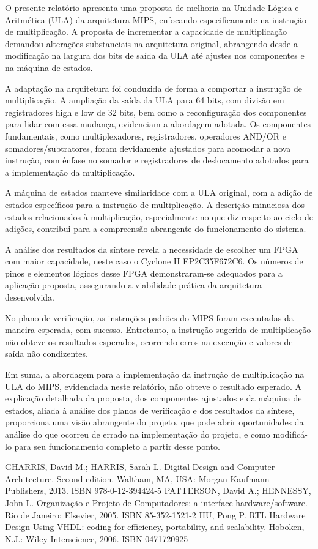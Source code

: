 \documentclass[conference]{IEEEtran}
\begin{document}
O presente relatório apresenta uma proposta de melhoria na Unidade Lógica e Aritmética (ULA) da arquitetura MIPS, enfocando especificamente na instrução de multiplicação. A proposta de incrementar a capacidade de multiplicação demandou alterações substanciais na arquitetura original, abrangendo desde a modificação na largura dos bits de saída da ULA até ajustes nos componentes e na máquina de estados.

A adaptação na arquitetura foi conduzida de forma a comportar a instrução de multiplicação. A ampliação da saída da ULA para 64 bits, com divisão em registradores high e low de 32 bits, bem como a reconfiguração dos componentes para lidar com essa mudança, evidenciam a abordagem adotada. Os componentes fundamentais, como multiplexadores, registradores, operadores AND/OR e somadores/subtratores, foram devidamente ajustados para acomodar a nova instrução, com ênfase no somador e registradores de deslocamento adotados para a implementação da multiplicação.

A máquina de estados manteve similaridade com a ULA original, com a adição de estados específicos para a instrução de multiplicação. A descrição minuciosa dos estados relacionados à multiplicação, especialmente no que diz respeito ao ciclo de adições, contribui para a compreensão abrangente do funcionamento do sistema.

A análise dos resultados da síntese revela a necessidade de escolher um FPGA com maior capacidade, neste caso o Cyclone II EP2C35F672C6. Os números de pinos e elementos lógicos desse FPGA demonstraram-se adequados para a aplicação proposta, assegurando a viabilidade prática da arquitetura desenvolvida.

No plano de verificação, as instruções padrões do MIPS foram executadas da maneira esperada, com sucesso. Entretanto, a instrução sugerida de multiplicação não obteve os resultados esperados, ocorrendo erros na execução e valores de saída não condizentes.

Em suma, a abordagem para a implementação da instrução de multiplicação na ULA do MIPS, evidenciada neste relatório, não obteve o resultado esperado. A explicação detalhada da proposta, dos componentes ajustados e da máquina de estados, aliada à análise dos planos de verificação e dos resultados da síntese, proporciona uma visão abrangente do projeto, que pode abrir oportunidades da análise do que ocorreu de errado na implementação do projeto, e como modificá-lo para seu funcionamento completo a partir desse ponto.

\begin{thebibliography}{00}
 GHARRIS, David M.; HARRIS, Sarah L. Digital Design and Computer Architecture. Second edition. Waltham, MA, USA: Morgan Kaufmann Publishers, 2013. ISBN 978-0-12-394424-5
 PATTERSON, David A.; HENNESSY, John L. Organização e Projeto de Computadores: a interface hardware/software. Rio de Janeiro: Elsevier, 2005. ISBN 85-352-1521-2
 HU, Pong P. RTL Hardware Design Using VHDL: coding for efficiency, portability, and scalability. Hoboken, N.J.: Wiley-Interscience, 2006. ISBN 0471720925
\end{thebibliography}
\end{document}
